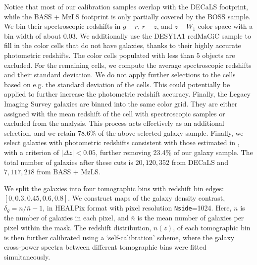 \documentclass[twocolumn]{aastex631}
\begin{document}
{Notice that most of our calibration samples overlap with the DECaLS footprint, while the BASS + MzLS footprint is only partially covered by the BOSS sample.
We bin their spectroscopic redshifts in $g-r$, $r-z$, and $z-W_1$ color space with a bin width of about 0.03. We additionally use the DESY1A1 redMaGiC sample \citep{2018MNRAS.481.2427C} to fill in the color cells that do not have galaxies, thanks to their highly accurate photometric redshifts. 
The color cells populated with less than $5$ objects are excluded. For the remaining cells, we compute the average spectroscopic redshifts and their standard deviation. 
We do not apply further selections to the cells based on e.g. the standard deviation of the cells. This could potentially be applied to further increase the photometric redshift accuracy. Finally, the Legacy Imaging Survey galaxies are binned into the same color grid. They are either assigned with the mean redshift of the cell with spectroscopic samples or excluded from the analysis. This process acts effectively as an additional selection, and we retain $78.6\%$ of the above-selected galaxy sample.
Finally, we select galaxies with photometric redshifts consistent with those estimated in \cite{Zhou2020}, with a criterion of $|\Delta z|<0.05$, further removing 23.4\% of our galaxy sample. The total number of galaxies after these cuts is $20,120,352$ from DECaLS and $7,117,218$ from BASS + MzLS.

We split the galaxies into four tomographic bins with redshift bin edges: $[0, 0.3, 0.45, 0.6, 0.8]$. 
We construct maps of the galaxy density contrast, $\delta_g=n/\bar{n}-1$, in HEALPix \citep{2005ApJ...622..759G} format with pixel resolution \texttt{Nside}=1024. Here, $n$ is the number of galaxies in each pixel, and $\bar{n}$ is the mean number of galaxies per pixel within the mask.
The redshift distribution, $n(z)$, of each tomographic bin is then further calibrated using a `self-calibration' scheme, where the galaxy cross-power spectra between different tomographic bins were fitted simultaneously.

}
\end{document}
